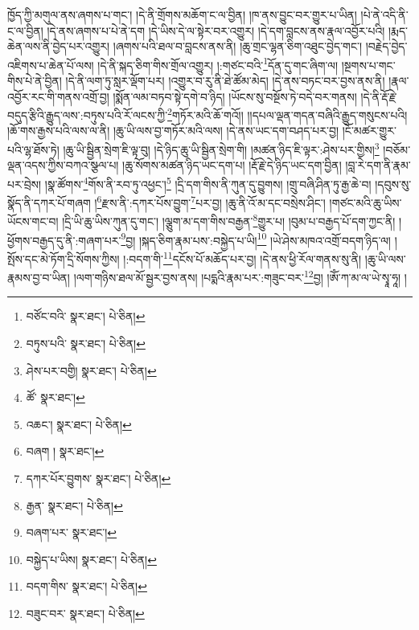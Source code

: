 ཁྱོད་ཀྱི་མགུལ་ནས་ཞགས་པ་གང་། །དེ་ནི་གྲོགས་མཆོག་ང་ལ་བྱིན། །ཁ་ནས་བྱུང་བར་གྱུར་པ་ཡིན། །པེ་ནེ་འདི་ནི་ང་ལ་བྱིན། །དེ་ནས་ཞགས་པ་པེ་ནེ་དག །དེ་ཡིས་དེ་ལ་སྟེར་བར་འགྱུར། །དེ་དག་བླངས་ནས་རྣལ་འབྱོར་པའི། །རྨད་ཆེན་ལས་ནི་བྱེད་པར་འགྱུར། །ཞགས་པའི་ཐལ་བ་བླངས་ནས་ནི། །ཆུ་གྲང་ལྷན་ཅིག་འཐུང་བྱེད་གང་། །བརྗེད་བྱེད་འཇིགས་པ་ཆེན་པོ་ལས། །དེ་ནི་སྐད་ཅིག་གིས་གྲོལ་འགྱུར། །:གཙང་བའི་\footnote{བཙོང་བའི་  སྣར་ཐང་།  པེ་ཅིན། }དོན་དུ་གང་ཞིག་ལ། །སྔགས་པ་གང་གིས་པེ་ནེ་བྱིན། །དེ་ནི་ལག་ཏུ་སླར་ལྡོག་པར། །འགྱུར་བ་རུ་ནི་ཐེ་ཚོམ་མེད། །དེ་ནས་བཏང་བར་བྱས་ནས་ནི། །རྣལ་འབྱོར་རང་གི་གནས་འགྲོ་བྱ། །སྨོན་ལམ་བཏབ་སྟེ་དགེ་བ་ཉིད། །ཡོངས་སུ་བསྔོས་ཏེ་བདེ་བར་གནས། །དེ་ནི་རྡོ་རྗེ་བདུད་རྩིའི་རྒྱུད་ལས་:བཏུས་པའི་རོ་ལངས་ཀྱི་\footnote{བཏུས་པའི་  སྣར་ཐང་།  པེ་ཅིན། }གཏོར་མའི་ཆོ་གའོ།། །།དཔལ་ལྡན་གདན་བཞིའི་རྒྱུད་གསུངས་པའི། །ཆོ་གས་རྒྱས་པའི་ལས་ལ་ནི། །ཆུ་ཡི་ལས་བྱ་གཏོར་མའི་ལས། །དེ་ནས་ཡང་དག་བཤད་པར་བྱ། །ངོ་མཚར་གྱུར་པའི་ལྷ་ཐོས་ཏེ། །ཆུ་ཡི་སྦྱིན་སྲེག་ཇི་ལྟ་བུ། །དེ་ཉིད་ཆུ་ཡི་སྦྱིན་སྲེག་གི། །མཚན་ཉིད་ཇི་ལྟར་:ཤེས་པར་གྱིས།\footnote{ཤེས་པར་བགྱི།  སྣར་ཐང་།  པེ་ཅིན། } །བཅོམ་ལྡན་འདས་ཀྱིས་བཀའ་སྩལ་པ། །ཆུ་སོགས་མཚན་ཉིད་ཡང་དག་པ། །རྡོ་རྗེ་དེ་ཉིད་ཡང་དག་བྱིན། །བླ་རེ་དག་ནི་རྣམ་པར་བྲེས། །སྣ་ཚོགས་\footnote{ཚོ་  སྣར་ཐང་། }གོས་ནི་རབ་ཏུ་འཕྱང་།\footnote{འཆང་།  སྣར་ཐང་།  པེ་ཅིན། } །དྲི་དག་གིས་ནི་ཀུན་དུ་བྱུགས། །གྲུ་བཞི་ཤིན་ཏུ་རྒྱ་ཆེ་བ། །དབུས་སུ་སྣོད་ནི་དཀར་པོ་གཞག །\footnote{བཞག །  སྣར་ཐང་། }རྫས་ནི་:དཀར་པོས་བྱུག་\footnote{དཀར་པོར་བྱུགས་  སྣར་ཐང་།  པེ་ཅིན། }པར་བྱ། །ཆུ་ནི་འོ་མ་དང་བསྲེས་ཤིང་། །གཙང་མའི་ཆུ་ཡིས་ཡོངས་གང་བ། །དྲི་ཡི་ཆུ་ཡིས་ཀུན་དུ་གང་། །ལྕུག་མ་དག་གིས་བརྒྱན་\footnote{རྒྱན་  སྣར་ཐང་།  པེ་ཅིན། }གྱུར་པ། །བུམ་པ་བརྒྱད་པོ་དག་ཀྱང་ནི། །ཕྱོགས་བརྒྱད་དུ་ནི་:གཞག་པར་\footnote{བཞག་པར་  སྣར་ཐང་། }བྱ། །སྐད་ཅིག་རྣམ་པས་:བསྐྱེད་པ་ཡི།\footnote{བསྐྱེད་པ་ཡིས།  སྣར་ཐང་།  པེ་ཅིན། } །ཡེ་ཤེས་མཁའ་འགྲོ་བདག་ཉིད་ལ། །སྤོས་དང་མེ་ཏོག་དྲི་སོགས་ཀྱིས། །:བདག་གི་\footnote{བདག་གིས་  སྣར་ཐང་།  པེ་ཅིན། }དངོས་པོ་མཆོད་པར་བྱ། །དེ་ནས་ཕྱི་རོལ་གནས་སུ་ནི། །ཆུ་ཡི་ལས་རྣམས་བྱ་བ་ཡིན། །ལག་གཉིས་ཐལ་མོ་སྦྱར་བྱས་ནས། །པདྨའི་རྣམ་པར་:གཟུང་བར་\footnote{བཟུང་བར་  སྣར་ཐང་།  པེ་ཅིན། }བྱ། །ཨོཾ་ཀ་མ་ལ་ཡེ་སྭཱ་ཧཱ། །
